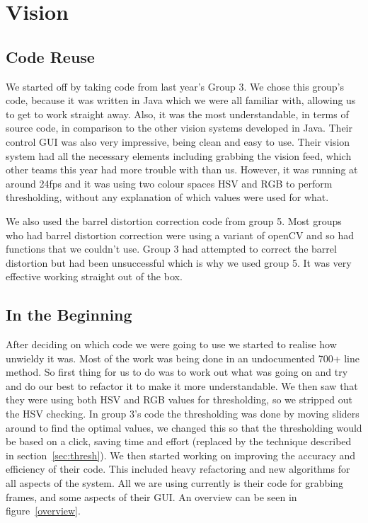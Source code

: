 \section{Vision}

\subsection{Code Reuse}

We started off by taking code from last year's Group 3. We chose this group's code, because it was written in Java which we were all familiar with, allowing us to get to work straight away. Also, it was the most understandable, in terms of source code, in comparison to the other vision systems developed in Java. Their control GUI was also very impressive, being clean and easy to use. Their vision system had all the necessary elements including grabbing the vision feed, which other teams this year had more trouble with than us. However, it was running at around 24fps and it was using two colour spaces HSV and RGB to perform thresholding, without any explanation of which values were used for what. 

We also used the barrel distortion correction code from group 5.  Most groups who had barrel distortion correction were using a variant of openCV and so had functions that we couldn't use.  Group 3 had attempted to correct the barrel distortion but had been unsuccessful which is why we used group 5.  It was very effective working straight out of the box.

\subsection{In the Beginning}

After deciding on which code we were going to use we started to realise how unwieldy it was. Most of the work was being done in an undocumented 700+ line method.  So first thing for us to do was to work out what was going on and try and do our best to refactor it to make it more understandable.  We then saw that they were using both HSV and RGB values for thresholding, so we stripped out the HSV checking.  In group 3's code the thresholding was done by moving sliders around to find the optimal values, we changed this so that the thresholding would be based on a click, saving time and effort (replaced by the technique described in section~\ref{sec:thresh}).  We then started working on improving the accuracy and efficiency of their code.  This included heavy refactoring and new algorithms for all aspects of the system.  All we are using currently is their code for grabbing frames, and some aspects of their GUI. An overview can be seen in figure~\ref{overview}.


